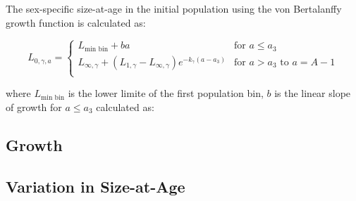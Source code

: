 \documentclass[11pt,
  english,
  letterpaper,
]{article}
\begin{document}
\leavevmode\tagmcend\tagstructend\par


The sex-specific size-at-age in the initial population using the von Bertalanffy growth function is calculated as:

\leavevmode\tagmcend\tagstructend\par


\begin{equation}
\label{eqn5}
L_{0,\gamma,a} = 
\begin{cases}
L_{\text{min bin}} + ba & \text{for $a \leq a_3$} \\
L_{\infty,\gamma} + (L_{1,\gamma} - L_{\infty,\gamma})e^{-k_{\gamma}(a-a_3)} & \text{for $a>a_3$ to $a=A-1$}\\
\end{cases}
\end{equation}

\leavevmode\tagmcend\tagstructend\par


where {\(L_{\text{min bin}}\)\leavevmode\tagmcend\tagstructend} is the lower limite of the first population bin, {\(b\)\leavevmode\tagmcend\tagstructend} is the linear slope of growth for {\(a \leq a_3\)\leavevmode\tagmcend\tagstructend} calculated as:

\leavevmode\tagmcend\tagstructend\par


\hypertarget{growth}{%
\subsection{Growth}\label{growth}}

\leavevmode\tagmcend\tagstructend


\hypertarget{variation-in-size-at-age}{%
\subsection{Variation in Size-at-Age}\label{variation-in-size-at-age}}
\end{document}
